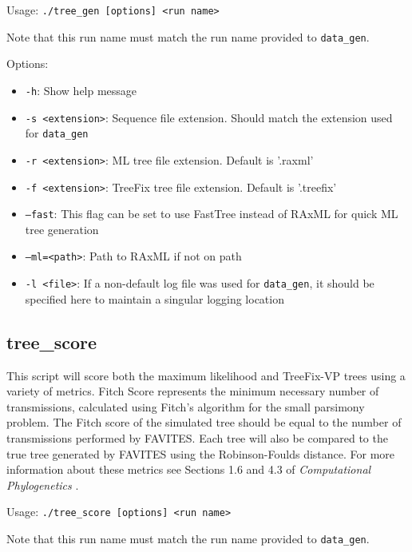 \documentclass[11pt]{article}
\begin{document}
    Usage: \texttt{./tree\_gen [options] <run name>}
    
    Note that this run name must match the run name provided to \texttt{data\_gen}.
    \vspace{2mm}

    Options:
    \begin{itemize}
        \setlength{\itemindent}{5mm}
        \item \texttt{-h}: Show help message
        \item \texttt{-s <extension>}: Sequence file extension. Should match the extension used for \texttt{data\_gen}
        \item \texttt{-r <extension>}: ML tree file extension. Default is '.raxml'
        \item \texttt{-f <extension>}: TreeFix tree file extension. Default is '.treefix'
        \item \texttt{--fast}: This flag can be set to use FastTree instead of RAxML for quick ML tree generation
        \item \texttt{--ml=<path>}: Path to RAxML if not on path
        \item \texttt{-l <file>}: If a non-default log file was used for \texttt{data\_gen}, it should be specified here to maintain a singular logging location
    \end{itemize}

\subsection{tree\_score}
    This script will score both the maximum likelihood and TreeFix-VP trees using a variety of metrics. Fitch Score represents the minimum necessary number of transmissions, calculated using Fitch's algorithm for the small parsimony problem. The Fitch score of the simulated tree should be equal to the number of transmissions performed by FAVITES. Each tree will also be compared to the true tree generated by FAVITES using the Robinson-Foulds distance. For more information about these metrics see Sections 1.6 and 4.3 of \textit{Computational Phylogenetics} \cite{tandy}.

    \vspace{2mm}
    Usage: \texttt{./tree\_score [options] <run name>}
    
    Note that this run name must match the run name provided to \texttt{data\_gen}.
    \vspace{2mm}
\end{document}
